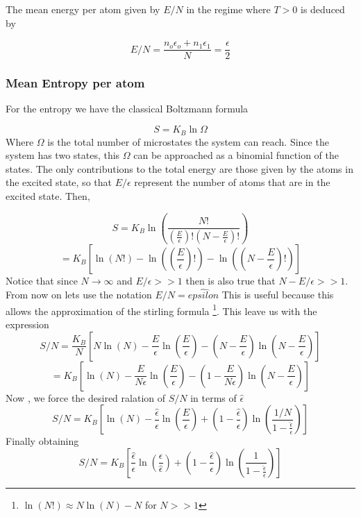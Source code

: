 \documentclass{article}
\begin{document}
The mean energy per atom given by $E/N$ in the regime where $T>0$ is deduced by

\begin{equation}
    E/N  = \frac{n_o \epsilon_o + n_1 \epsilon_1}{N} = \frac{\epsilon}{2}
\end{equation}

\subsubsection*{Mean Entropy per atom}
For the entropy we have the classical Boltzmann formula

\begin{equation}
    S = K_B \ln \Omega
\end{equation}
Where $\Omega$ is the total number of microstates the system can reach. Since the system has two states, this $\Omega$ can be approached as a binomial function of the states. The only contributions to the total energy are those given by the atoms in the excited state, so that $E/\epsilon$ represent the number of atoms that are in the excited state. Then,

\begin{equation}
     S = K_B \ln \left( \frac{N!}{\left(\frac{E}{\epsilon}\right)!\left(N - \frac{E}{\epsilon}\right)!} \right)
\end{equation}
\begin{equation*}
   = K_B\left[ \ln\left(N!\right) - \ln\left(\left(\frac{E}{\epsilon}\right)!\right)-\ln\left(\left(N - \frac{E}{\epsilon}\right)!\right)\right] 
\end{equation*}
Notice that since $N \to \infty$ and $E/\epsilon >> 1$ then is also true that $N - E/\epsilon >> 1$. From now on lets use the notation $E/N = \hat{epsilon}$ This is useful because this allows the approximation of the stirling formula \footnote{$\ln(N!) \approx N \ln(N) - N$ for $N>>1$}. This leave us with the expression
\begin{equation}
    S/N = \frac{K_B}{N}\left[ N\ln(N) -\frac{E}{\epsilon}\ln \left(\frac{E}{\epsilon}\right)-\left(N-\frac{E}{\epsilon}\right)\ln\left(N - \frac{E}{\epsilon}\right)\right] 
\end{equation}
\begin{equation*}
    = K_B\left[\ln(N) -\frac{E}{N\epsilon}\ln \left(\frac{E}{\epsilon}\right)-\left(1-\frac{E}{N\epsilon}\right)\ln\left(N - \frac{E}{\epsilon}\right)\right] 
\end{equation*}
Now , we force the desired ralation of $S/N$ in terms of $\hat{\epsilon}$ 
\begin{equation}
    S/N = K_B\left[\ln(N) -\frac{\hat{\epsilon}}{\epsilon}\ln \left(\frac{E}{\epsilon}\right)+\left(1-\frac{\hat{\epsilon}}{\epsilon}\right)\ln\left(\frac{1/N}{1-\frac{\hat{\epsilon}}{\epsilon}} \right)\right] 
\end{equation}
Finally obtaining
\begin{equation}
    S/N = K_B\left[\frac{\hat{\epsilon}}{\epsilon}\ln \left(\frac{\epsilon}{\hat{\epsilon}}\right)+\left(1-\frac{\hat{\epsilon}}{\epsilon}\right)\ln\left(\frac{1}{1-\frac{\hat{\epsilon}}{\epsilon}} \right)\right] 
\end{equation}
\end{document}
